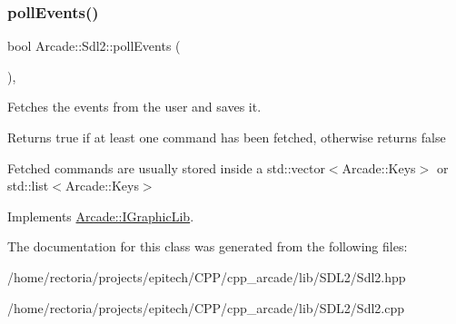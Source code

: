 \mbox{\label{class_arcade_1_1_sdl2_af794699db9401d1be49566908ec7bced}} 
\subsubsection{\texorpdfstring{poll\+Events()}{pollEvents()}}
{\footnotesize\ttfamily bool Arcade\+::\+Sdl2\+::poll\+Events (\begin{DoxyParamCaption}{ }\end{DoxyParamCaption})\hspace{0.3cm}{\ttfamily [final]}, {\ttfamily [virtual]}}



Fetches the events from the user and saves it. 

\begin{DoxyReturn}{Returns}
true if at least one command has been fetched, otherwise returns false
\end{DoxyReturn}
Fetched commands are usually stored inside a std\+::vector$<$\+Arcade\+::\+Keys$>$ or std\+::list$<$\+Arcade\+::\+Keys$>$ 

Implements \hyperlink{class_arcade_1_1_i_graphic_lib_a6be852f0395f08943f988c6823b80937}{Arcade\+::\+I\+Graphic\+Lib}.



The documentation for this class was generated from the following files\+:\begin{DoxyCompactItemize}
\item 
/home/rectoria/projects/epitech/\+C\+P\+P/cpp\+\_\+arcade/lib/\+S\+D\+L2/Sdl2.\+hpp\item 
/home/rectoria/projects/epitech/\+C\+P\+P/cpp\+\_\+arcade/lib/\+S\+D\+L2/Sdl2.\+cpp\end{DoxyCompactItemize}
